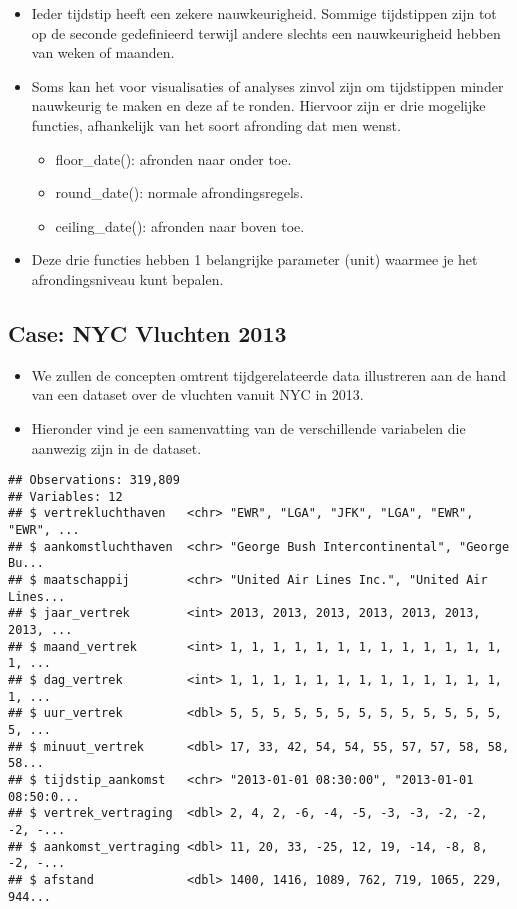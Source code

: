 \documentclass[]{memoir}
\providecommand{\tightlist}{%
  \setlength{\itemsep}{0pt}\setlength{\parskip}{0pt}}
\begin{document}
\begin{itemize}
\tightlist
\item
  Ieder tijdstip heeft een zekere nauwkeurigheid. Sommige tijdstippen
  zijn tot op de seconde gedefinieerd terwijl andere slechts een
  nauwkeurigheid hebben van weken of maanden.
\item
  Soms kan het voor visualisaties of analyses zinvol zijn om tijdstippen
  minder nauwkeurig te maken en deze af te ronden. Hiervoor zijn er drie
  mogelijke functies, afhankelijk van het soort afronding dat men wenst.

  \begin{itemize}
  \tightlist
  \item
    floor\_date(): afronden naar onder toe.
  \item
    round\_date(): normale afrondingsregels.
  \item
    ceiling\_date(): afronden naar boven toe.
  \end{itemize}
\item
  Deze drie functies hebben 1 belangrijke parameter (unit) waarmee je
  het afrondingsniveau kunt bepalen.
\end{itemize}

\subsection{Case: NYC Vluchten 2013}\label{case-nyc-vluchten-2013}

\begin{itemize}
\tightlist
\item
  We zullen de concepten omtrent tijdgerelateerde data illustreren aan
  de hand van een dataset over de vluchten vanuit NYC in 2013.
\item
  Hieronder vind je een samenvatting van de verschillende variabelen die
  aanwezig zijn in de dataset.
\end{itemize}

\begin{verbatim}
## Observations: 319,809
## Variables: 12
## $ vertrekluchthaven   <chr> "EWR", "LGA", "JFK", "LGA", "EWR", "EWR", ...
## $ aankomstluchthaven  <chr> "George Bush Intercontinental", "George Bu...
## $ maatschappij        <chr> "United Air Lines Inc.", "United Air Lines...
## $ jaar_vertrek        <int> 2013, 2013, 2013, 2013, 2013, 2013, 2013, ...
## $ maand_vertrek       <int> 1, 1, 1, 1, 1, 1, 1, 1, 1, 1, 1, 1, 1, 1, ...
## $ dag_vertrek         <int> 1, 1, 1, 1, 1, 1, 1, 1, 1, 1, 1, 1, 1, 1, ...
## $ uur_vertrek         <dbl> 5, 5, 5, 5, 5, 5, 5, 5, 5, 5, 5, 5, 5, 5, ...
## $ minuut_vertrek      <dbl> 17, 33, 42, 54, 54, 55, 57, 57, 58, 58, 58...
## $ tijdstip_aankomst   <chr> "2013-01-01 08:30:00", "2013-01-01 08:50:0...
## $ vertrek_vertraging  <dbl> 2, 4, 2, -6, -4, -5, -3, -3, -2, -2, -2, -...
## $ aankomst_vertraging <dbl> 11, 20, 33, -25, 12, 19, -14, -8, 8, -2, -...
## $ afstand             <dbl> 1400, 1416, 1089, 762, 719, 1065, 229, 944...
\end{verbatim}
\end{document}
